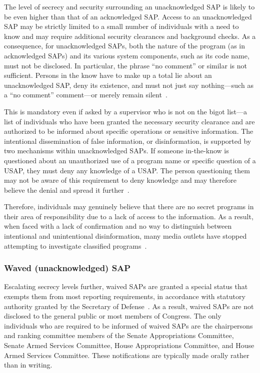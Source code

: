 The level of secrecy and security surrounding an unacknowledged SAP is likely to be even higher than that of an acknowledged SAP. Access to an unacknowledged SAP may be strictly limited to a small number of individuals with a need to know and may require additional security clearances and background checks. As a consequence, for unacknowledged SAPs, both the nature of the program (as in acknowledged SAPs) and its various system components, such as its code name, must not be disclosed. In particular, the phrase ``no comment'' or similar is not sufficient. Persons in the know have to make up a total lie about an unacknowledged SAP, deny its existence, and must not just say nothing---such as a ``no comment'' comment---or merely remain silent~\cite{Dolan-MrX-Disclosure2020Jul}.

This is mandatory even if asked by a supervisor who is not on the bigot list---a list of individuals who have been granted the necessary security clearance and are authorized to be informed about specific operations or sensitive information. The intentional dissemination of false information, or disinformation, is supported by two mechanisms within unacknowledged SAPs. If someone in-the-know is questioned about an unauthorized use of a program name or specific question of a USAP, they must deny any knowledge of a USAP. The person questioning them may not be aware of this requirement to deny knowledge and may therefore believe the denial and spread it further~\cite{Sweetman2000}.

Therefore, individuals may genuinely believe that there are no secret programs in their area of responsibility due to a lack of access to the information. As a result, when faced with a lack of confirmation and no way to distinguish between intentional and unintentional disinformation, many media outlets have stopped attempting to investigate classified programs~\cite{Sweetman2000}.


\subsubsection{Waved (unacknowledged) SAP}

Escalating secrecy levels further, waived SAPs are granted a special status that exempts them from most reporting requirements, in accordance with statutory authority granted by the Secretary of Defense~\cite{Dolan-MrX-Disclosure2020Jul}. As a result, waived SAPs are not disclosed to the general public or most members of Congress. The only individuals who are required to be informed of waived SAPs are the chairpersons and ranking committee members of the Senate Appropriations Committee, Senate Armed Services Committee, House Appropriations Committee, and House Armed Services Committee. These notifications are typically made orally rather than in writing.



